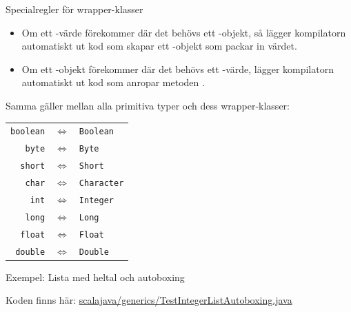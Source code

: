 \begin{Slide}{Specialregler för wrapper-klasser}\footnotesize
\begin{itemize}
\item Om ett -värde förekommer där det behövs ett -objekt, så lägger kompilatorn automatiskt ut kod som skapar ett -objekt som packar in värdet.
\item Om ett -objekt förekommer där det behövs ett -värde, lägger kompilatorn automatiskt ut kod som anropar metoden .
\end{itemize}
Samma gäller mellan alla primitiva typer och dess wrapper-klasser:

\begin{tabular}{r c l}
 {\lstinline!boolean!} &$\Leftrightarrow$& {\lstinline!Boolean!} \\
 {\lstinline!byte!} &$\Leftrightarrow$& {\lstinline!Byte!}\\
 {\lstinline!short!}&$\Leftrightarrow$& {\lstinline!Short!}\\
 {\lstinline!char!} &$\Leftrightarrow$& {\lstinline!Character!}\\
 {\lstinline!int!} &$\Leftrightarrow$& {\lstinline!Integer!}\\
 {\lstinline!long!} &$\Leftrightarrow$& {\lstinline!Long!}\\
 {\lstinline!float!} &$\Leftrightarrow$& {\lstinline!Float!}\\
 {\lstinline!double!} &$\Leftrightarrow$&{\lstinline!Double!}\\
\end{tabular}

\end{Slide}






\begin{Slide}{Exempel: Lista med heltal och autoboxing}

\scriptsize Koden finns här: \href{https://github.com/lunduniversity/introprog/tree/master/compendium/examples/scalajava/generics/TestIntegerList.java}{scalajava/generics/TestIntegerListAutoboxing.java}
\end{Slide}

